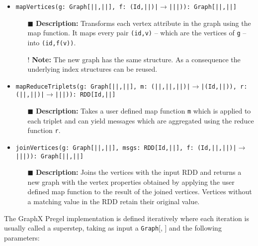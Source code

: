 \begin{itemize}
    \setlength\itemsep{1em}
    \item \texttt{mapVertices(g: Graph[|\VertSet|,|\EdgeSet|], f: (Id,|\VertSet|)|$\rightarrow$||\VertSet|)): Graph[|\VertSet|,|\EdgeSet|]}
          \begin{itemize}
              \item[$\blacksquare$] \textbf{Description:} Transforms each vertex attribute in the graph using the map function. It maps every pair \texttt{(id,v)} -- which are the vertices of \texttt{g} -- into \texttt{(id,f(v))}.
              \item[!] \textbf{Note:} The new graph has the same structure. As a consequence the underlying index structures can be reused.
          \end{itemize}
    \item \texttt{mapReduceTriplets(g: Graph[|\VertSet|,|\EdgeSet|], m: (|\VertSet|,|\EdgeSet|,|\VertSet|)|$\rightarrow$|(Id,|\MsgSet|)), r: (|\MsgSet|,|\MsgSet|)|$\rightarrow$||\MsgSet|)): RDD[Id,|\MsgSet|]}
          \begin{itemize}
              \item[$\blacksquare$] \textbf{Description:} Takes a user defined map function \texttt{m} which is applied to each triplet and can yield messages which are aggregated using the reduce function \texttt{r}.
          \end{itemize}
    \item \texttt{joinVertices(g: Graph[|\VertSet|,|\EdgeSet|], msgs: RDD[Id,|\MsgSet|], f: (Id,|\VertSet|,|\MsgSet|)|$\rightarrow$||\VertSet|)): Graph[|\VertSet|,|\EdgeSet|]}
          \begin{itemize}
              \item[$\blacksquare$] \textbf{Description:} Joins the vertices with the input RDD and returns a new graph with the vertex properties obtained by applying the user defined map function to the result of the joined vertices. Vertices without a matching value in the RDD retain their original value.
          \end{itemize}
\end{itemize}

The GraphX Pregel implementation is defined iteratively where each iteration is usually called a superstep, taking as input a \texttt{Graph}[\VertSet, \EdgeSet] and the following parameters:

